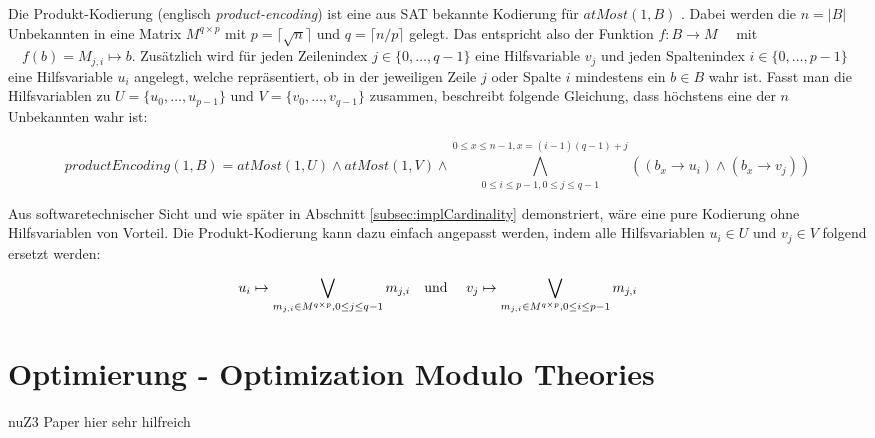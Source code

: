 Die Produkt-Kodierung (englisch \textit{product-encoding}) ist eine aus SAT bekannte Kodierung für $atMost(1,B)$ \cite{amoChen}.
Dabei werden die $n = \lvert B \rvert$ Unbekannten in eine Matrix $M^{q \times p}$ mit $p = \lceil \sqrt {n} \rceil$ und $q = \lceil n/p \rceil$ gelegt.
Das entspricht also der Funktion $f: B \to M \quad$ mit $\quad f(b) = M_{j,i} \mapsto b$.
Zusätzlich wird für jeden Zeilenindex $j \in \{0,\ldots,q-1\}$ eine Hilfsvariable $v_j$ und jeden Spaltenindex $i \in \{0,\ldots,p-1\}$ eine Hilfsvariable $u_i$ angelegt,
welche repräsentiert, ob in der jeweiligen Zeile $j$ oder Spalte $i$ mindestens ein $b \in B$ wahr ist.
Fasst man die Hilfsvariablen zu $U = \{ u_0,\ldots, u_{p-1} \}$ und $V = \{ v_0,\ldots, v_{q-1} \}$ zusammen, beschreibt folgende Gleichung,
dass höchstens eine der $n$ Unbekannten wahr ist:

\[
    productEncoding(1,B) = atMost(1,U) \land atMost(1,V) \land \bigwedge_{0 \leq i \leq p-1, 0 \leq j \leq q-1}^{0 \leq x \leq n-1, x = (i-1)(q-1)+j} ((b_x \rightarrow u_i) \land (b_x \rightarrow v_j) )
\]

Aus softwaretechnischer Sicht und wie später in Abschnitt \ref{subsec:implCardinality} demonstriert, wäre eine pure Kodierung ohne Hilfsvariablen von Vorteil.
Die Produkt-Kodierung kann dazu einfach angepasst werden, indem alle Hilfsvariablen $u_i \in U$ und $v_j \in V$ folgend ersetzt werden:

\[
    u_i \mapsto \bigvee_{m_{j,i} \in M^{q \times p}, 0 \leq j \leq q-1} m_{j,i} \text{\quad und \quad}
    v_j \mapsto \bigvee_{m_{j,i} \in M^{q \times p}, 0 \leq i \leq p-1} m_{j,i}
\]

\section{Optimierung - Optimization Modulo Theories}
nuZ3 Paper hier sehr hilfreich \cite{nuz3}
